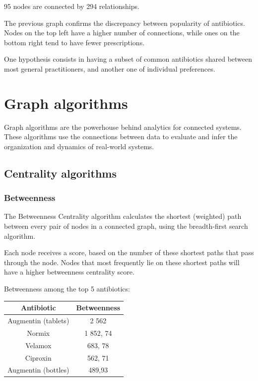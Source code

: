 95 nodes are connected by 294 relationships.

The previous graph confirms the discrepancy between popularity of antibiotics. Nodes on the top left have a higher number of connections, while ones on the bottom right tend to have fewer prescriptions.

One hypothesis consists in having a subset of common antibiotics shared between most general practitioners, and another one of individual preferences.

\section{Graph algorithms}
Graph algorithms are the powerhouse behind analytics for connected systems. These algorithms use the connections between data to evaluate and infer the organization and dynamics of real-world systems\cite{neo4jdocumentation}.

\subsection{Centrality algorithms}

\subsubsection{Betweenness}
The Betweenness Centrality algorithm calculates the shortest (weighted) path between every pair of nodes in a connected graph, using the breadth-first search algorithm. 

Each node receives a score, based on the number of these shortest paths that pass through the node. Nodes that most frequently lie on these shortest paths will have a higher betweenness centrality score. 

Betweenness among the top 5 antibiotics:
\begin{center}
	\begin{tabular}{c|c}
		Antibiotic & Betweenness \\
		\hline
		Augmentin (tablets) & 2 562 \\
		\hline
		Normix & 1 852, 74 \\
		\hline
		Velamox & 683, 78 \\
		\hline
		Ciproxin & 562, 71 \\
		\hline
		Augmentin (bottles) & 489,93 \\
	\end{tabular}
\end{center}

